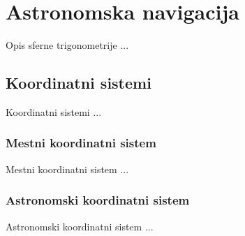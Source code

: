 \chapter{Astronomska navigacija}

Opis sferne trigonometrije ...

\section{Koordinatni sistemi}

Koordinatni sistemi ...

\subsection{Mestni koordinatni sistem}

Mestni koordinatni sistem ...

\subsection{Astronomski koordinatni sistem}

Astronomski koordinatni sistem ...